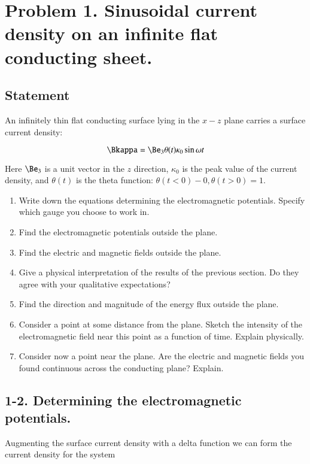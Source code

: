 \section{Problem 1.  Sinusoidal current density on an infinite flat conducting sheet.}
\subsection{Statement}

An infinitely thin flat conducting surface lying in the $x-z$ plane carries a surface current density:

\begin{equation}\label{eqn:relElectroDynProblemSet5P1:10}
\Bkappa = \Be_3 \theta(t) \kappa_0 \sin\omega t
\end{equation}

Here $\Be_3$ is a unit vector in the $z$ direction, $\kappa_0$ is the peak value of the current density, and $\theta(t)$ is the theta function: $\theta(t < 0) - 0, \theta(t > 0) = 1$.

\begin{enumerate}
\item Write down the equations determining the electromagnetic potentials.  Specify which gauge you choose to work in.
\item Find the electromagnetic potentials outside the plane.
\item Find the electric and magnetic fields outside the plane.
\item Give a physical interpretation of the results of the previous section.  Do they agree with your qualitative expectations?
\item Find the direction and magnitude of the energy flux outside the plane.
\item Consider a point at some distance from the plane.  Sketch the intensity of the electromagnetic field near this point as a function of time.  Explain physically.
\item Consider now a point near the plane.  Are the electric and magnetic fields you found continuous across the conducting plane?  Explain.
\end{enumerate}

\subsection{1-2.  Determining the electromagnetic potentials.}

Augmenting the surface current density with a delta function we can form the current density for the system

